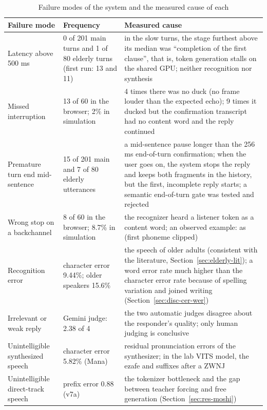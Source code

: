 \begin{table}[ht]
\centering
\caption{Failure modes of the system and the measured cause of each}
\label{tab:errors}
\small
\begin{tabular}{L{3.2cm}L{3.5cm}L{6.4cm}}
\toprule
\textbf{Failure mode} & \textbf{Frequency} & \textbf{Measured cause} \\
\midrule
Latency above 500 ms & 0 of 201 main turns and 1 of 80 elderly turns (first run: 13 and 11) &
  in the slow turns, the stage furthest above its median was ``completion of the first
  clause'', that is, token generation stalls on the shared GPU; neither recognition nor
  synthesis \\
Missed interruption & 13 of 60 in the browser; 2\% in simulation &
  4 times there was no duck (no frame louder than the expected echo); 9 times it ducked but
  the confirmation transcript had no content word and the reply continued \\
Premature turn end mid-sentence & 15 of 201 main and 7 of 80 elderly utterances &
  a mid-sentence pause longer than the 256 ms end-of-turn confirmation; when the user goes on,
  the system stops the reply and keeps both fragments in the history, but the first,
  incomplete reply starts; a semantic end-of-turn gate was tested and rejected \\
Wrong stop on a backchannel & 8 of 60 in the browser; 8.7\% in simulation &
  the recognizer heard a listener token as a content word; an observed example:
   as  (first phoneme clipped) \\
Recognition error & character error 9.44\%; older speakers 15.6\% &
  the speech of older adults (consistent with the literature, Section~\ref{sec:elderly-lit});
  a word error rate much higher than the character error rate because of spelling variation and
  joined writing (Section~\ref{sec:disc-cer-wer}) \\
Irrelevant or weak reply & Gemini judge: 2.38 of 4 &
  the two automatic judges disagree about the responder's quality; only human judging is
  conclusive \\
Unintelligible synthesized speech & character error 5.82\% (Mana) &
  residual pronunciation errors of the synthesizer; in the lab VITS model, the ezafe and
  suffixes after a ZWNJ \\
Unintelligible direct-track speech & prefix error 0.88 (v7a) &
  the tokenizer bottleneck and the gap between teacher forcing and free generation
  (Section~\ref{sec:res-moshi}) \\
\bottomrule
\end{tabular}
\end{table}

